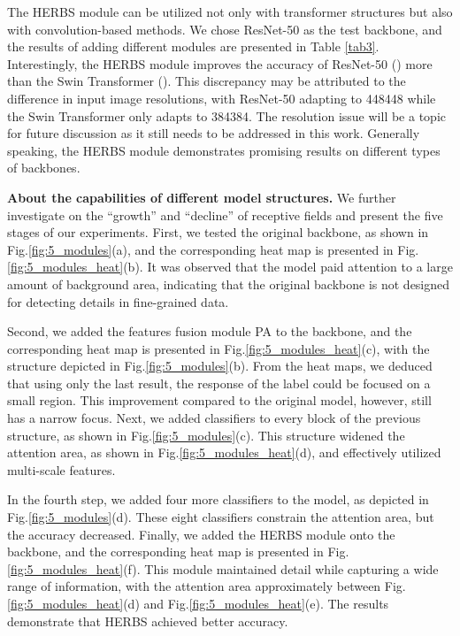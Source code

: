 \documentclass[journal]{IEEEtran}
\begin{document}
The HERBS module can be utilized not only with transformer structures but also with convolution-based methods. We chose ResNet-50 as the test backbone, and the results of adding different modules are presented in Table \ref{tab3}. Interestingly, the HERBS module improves the accuracy of ResNet-50 () more than the Swin Transformer (). This discrepancy may be attributed to the difference in input image resolutions, with ResNet-50 adapting to 448448 while the Swin Transformer only adapts to 384384. The resolution issue will be a topic for future discussion as it still needs to be addressed in this work. Generally speaking, the HERBS module demonstrates promising results on different types of backbones.

\textbf{About the capabilities of different model structures.} We further investigate on the ``growth'' and ``decline'' of receptive fields and present the five stages of our experiments. First, we tested the original backbone, as shown in Fig.\ref{fig:5_modules}(a), and the corresponding heat map is presented in Fig.\ref{fig:5_modules_heat}(b). It was observed that the model paid attention to a large amount of background area, indicating that the original backbone is not designed for detecting details in fine-grained data. 

Second, we added the features fusion module PA to the backbone, and the corresponding heat map is presented in Fig.\ref{fig:5_modules_heat}(c), with the structure depicted in Fig.\ref{fig:5_modules}(b). From the heat maps, we deduced that using only the last result, the response of the label could be focused on a small region. This improvement compared to the original model, however, still has a narrow focus. Next, we added classifiers to every block of the previous structure, as shown in Fig.\ref{fig:5_modules}(c). This structure widened the attention area, as shown in Fig.\ref{fig:5_modules_heat}(d), and effectively utilized multi-scale features. 

In the fourth step, we added four more classifiers to the model, as depicted in Fig.\ref{fig:5_modules}(d). These eight classifiers constrain the attention area, but the accuracy decreased. Finally, we added the HERBS module onto the backbone, and the corresponding heat map is presented in Fig.\ref{fig:5_modules_heat}(f). This module maintained detail while capturing a wide range of information, with the attention area approximately between Fig.\ref{fig:5_modules_heat}(d) and Fig.\ref{fig:5_modules_heat}(e). The results demonstrate that HERBS achieved better accuracy.
\end{document}
